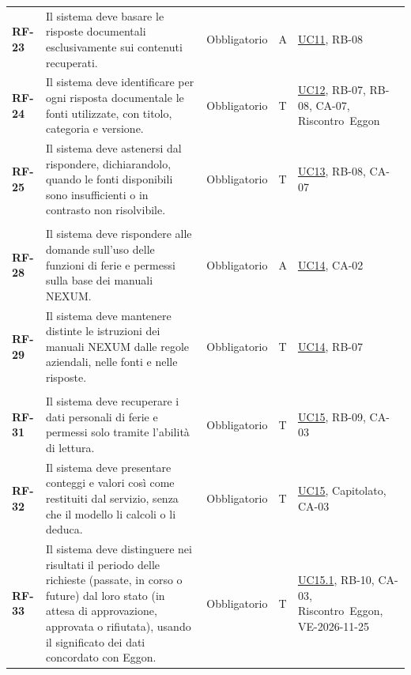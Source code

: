 \documentclass[documento]{gpt}
\begin{document}
{\begin{longtable}{@{}>{\raggedright\arraybackslash}p{1.35cm}>{\raggedright\arraybackslash}p{7.3cm}>{\raggedright\arraybackslash}p{1.9cm}>{\centering\arraybackslash}p{0.75cm}>{\raggedright\arraybackslash}p{3.1cm}@{}}
\leavevmode\hypertarget{req:RF-23}{\textbf{RF-23}} & Il sistema deve basare le risposte documentali esclusivamente sui contenuti recuperati. & Obbligatorio & A & \hyperref[uc:regole]{UC11}, \mbox{RB-08} \\
\leavevmode\hypertarget{req:RF-24}{\textbf{RF-24}} & Il sistema deve identificare per ogni risposta documentale le fonti utilizzate, con titolo, categoria e versione. & Obbligatorio & T & \hyperref[uc:fonti]{UC12}, \mbox{RB-07}, \mbox{RB-08}, \mbox{CA-07}, \mbox{Riscontro Eggon} \\
\leavevmode\hypertarget{req:RF-25}{\textbf{RF-25}} & Il sistema deve astenersi dal rispondere, dichiarandolo, quando le fonti disponibili sono insufficienti o in contrasto non risolvibile. & Obbligatorio & T & \hyperref[uc:astensione]{UC13}, \mbox{RB-08}, \mbox{CA-07} \\
\addlinespace[3pt]\multicolumn{5}{@{}l}{\textbf{\sffamily Istruzioni NEXUM}} \\ \addlinespace[2pt]
\leavevmode\hypertarget{req:RF-28}{\textbf{RF-28}} & Il sistema deve rispondere alle domande sull’uso delle funzioni di ferie e permessi sulla base dei manuali NEXUM. & Obbligatorio & A & \hyperref[uc:prodotto]{UC14}, \mbox{CA-02} \\
\leavevmode\hypertarget{req:RF-29}{\textbf{RF-29}} & Il sistema deve mantenere distinte le istruzioni dei manuali NEXUM dalle regole aziendali, nelle fonti e nelle risposte. & Obbligatorio & T & \hyperref[uc:prodotto]{UC14}, \mbox{RB-07} \\
\addlinespace[3pt]\multicolumn{5}{@{}l}{\textbf{\sffamily Lettura dei dati}} \\ \addlinespace[2pt]
\leavevmode\hypertarget{req:RF-31}{\textbf{RF-31}} & Il sistema deve recuperare i dati personali di ferie e permessi solo tramite l’abilità di lettura. & Obbligatorio & T & \hyperref[uc:dati]{UC15}, \mbox{RB-09}, \mbox{CA-03} \\
\leavevmode\hypertarget{req:RF-32}{\textbf{RF-32}} & Il sistema deve presentare conteggi e valori così come restituiti dal servizio, senza che il modello li calcoli o li deduca. & Obbligatorio & T & \hyperref[uc:dati]{UC15}, \mbox{Capitolato}, \mbox{CA-03} \\
\leavevmode\hypertarget{req:RF-33}{\textbf{RF-33}} & Il sistema deve distinguere nei risultati il periodo delle richieste (passate, in corso o future) dal loro stato (in attesa di approvazione, approvata o rifiutata), usando il significato dei dati concordato con Eggon. & Obbligatorio & T & \hyperref[uc:dati_riep]{UC15.1}, \mbox{RB-10}, \mbox{CA-03}, \mbox{Riscontro Eggon}, \mbox{VE-2026-11-25} \\

\end{longtable}}
\end{document}
